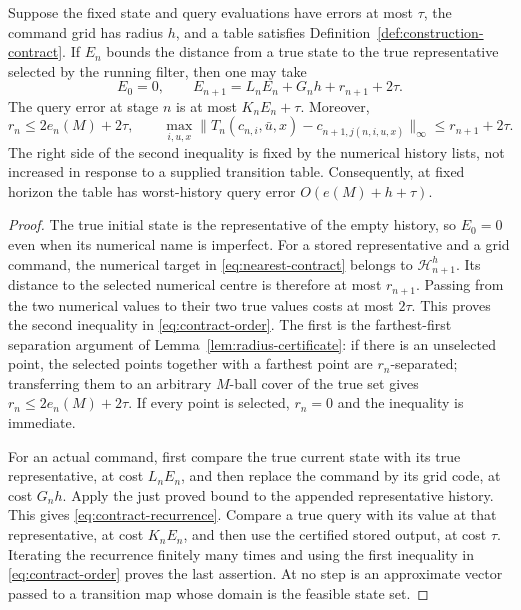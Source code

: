 \begin{theorem}
\label{thm:construction-contract}
Suppose the fixed state and query evaluations have errors at most $\tau$,
the command grid has radius $h$, and a table satisfies
Definition~\ref{def:construction-contract}. If $E_n$ bounds the distance
from a true state to the true representative selected by the running
filter, then one may take
\begin{equation}\label{eq:contract-recurrence}
 E_0=0,\qquad E_{n+1}=L_nE_n+G_nh+r_{n+1}+2\tau.
\end{equation}
The query error at stage $n$ is at most $K_nE_n+\tau$.
Moreover,
\begin{equation}\label{eq:contract-order}
 r_n\le 2e_n(M)+2\tau,\qquad
 \max_{i,u,x}\|T_n(c_{n,i},\bar u,x)-c_{n+1,j(n,i,u,x)}\|_\infty
       \le r_{n+1}+2\tau.
\end{equation}
The right side of the second inequality is fixed by the numerical
history lists, not increased in response to a supplied transition table.
Consequently, at fixed horizon the table has worst-history query error
$O(e(M)+h+\tau)$.
\end{theorem}
\begin{proof}
The true initial state is the representative of the empty history, so
$E_0=0$ even when its numerical name is imperfect. For a stored
representative and a grid command, the numerical target in
\eqref{eq:nearest-contract} belongs to $\mathcal H_{n+1}^h$.
Its distance to the selected numerical centre is therefore at most
$r_{n+1}$. Passing from the two numerical values to their two true
values costs at most $2\tau$. This proves the second inequality in
\eqref{eq:contract-order}. The first is the farthest-first separation
argument of Lemma~\ref{lem:radius-certificate}: if there is an
unselected point, the selected points together with a farthest point
are $r_n$-separated; transferring them to an arbitrary $M$-ball cover
of the true set gives $r_n\le2e_n(M)+2\tau$. If every point is
selected, $r_n=0$ and the inequality is immediate.

For an actual command, first compare the true current state with its
true representative, at cost $L_nE_n$, and then replace the command
by its grid code, at cost $G_nh$. Apply the just proved bound to the
appended representative history. This gives
\eqref{eq:contract-recurrence}. Compare a true query with its value
at that representative, at cost $K_nE_n$, and then use the certified
stored output, at cost $\tau$. Iterating the recurrence finitely many
times and using the first inequality in \eqref{eq:contract-order}
proves the last assertion. At no step is an approximate vector passed
to a transition map whose domain is the feasible state set.
\end{proof}

